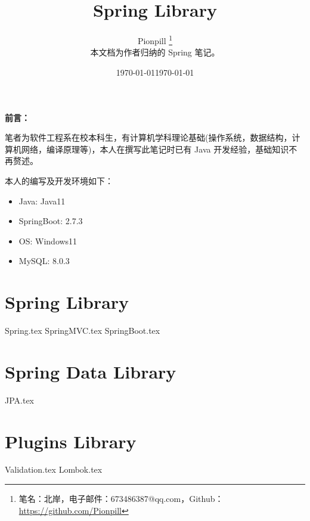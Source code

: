 \documentclass{PionpillNote-book}
\title{Spring Library}
\author{
    Pionpill \footnote{笔名：北岸，电子邮件：673486387@qq.com，Github：\url{https://github.com/Pionpill}} \\
    本文档为作者归纳的 Spring 笔记。\\
}
\date{\today}
\begin{document}
\pagestyle{plain}
\maketitle

\noindent\textbf{前言：}

笔者为软件工程系在校本科生，有计算机学科理论基础(操作系统，数据结构，计算机网络，编译原理等)，本人在撰写此笔记时已有 Java 开发经验，基础知识不再赘述。

本人的编写及开发环境如下：
\begin{itemize}
    \item Java: Java11
    \item SpringBoot: 2.7.3
    \item OS: Windows11
    \item MySQL: 8.0.3
\end{itemize}

\date{\today}
\newpage

\tableofcontents

\newpage

\setcounter{page}{1}
\pagestyle{fancy}

\part{Spring Library}
{Spring.tex}
{SpringMVC.tex}
{SpringBoot.tex}
\part{Spring Data Library}
{JPA.tex}

\part{Plugins Library}
{Validation.tex}
{Lombok.tex}
\end{document}
